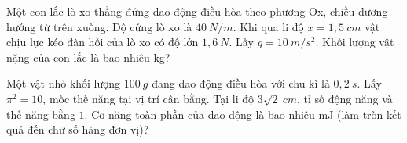 \begin{ex}%
	Một con lắc lò xo thẳng đứng dao động điều hòa theo phương Ox, chiều dương hướng từ trên xuống. Độ cứng lò xo là $40\ N/m$. Khi qua li độ $x = 1,5\ cm$ vật chịu lực kéo đàn hồi của lò xo có độ lớn $1,6\ N$. Lấy $g = 10\ m/s^2$. Khối lượng vật nặng của con lắc là bao nhiêu kg?
\end{ex}
\begin{ex} %
	Một vật nhỏ khối lượng $100\ g$ đang dao động điều hòa với chu kì là $0,2\ s$. Lấy $\pi^2 = 10$, mốc thế năng tại vị trí cân bằng. Tại li độ $3\sqrt{2}\ cm$, tỉ số động năng và thế năng bằng $1$. Cơ năng toàn phần của dao động là bao nhiêu mJ (làm tròn kết quả đến chữ số hàng đơn vị)?
\end{ex}
